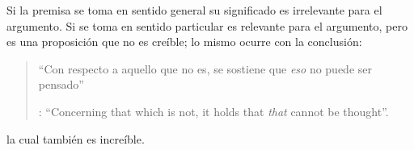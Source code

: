 Si la premisa se toma en sentido general su significado es irrelevante para el argumento. Si se toma en sentido particular es relevante para el argumento, pero es una proposición que no es creíble; lo mismo ocurre con la conclusión: \blockquote[{\Cite[3]{anscombe1981parmenides:pmc}}: \enquote{Concerning that which is not, it holds that \emph{that} cannot be thought}.]{\enquote{Con respecto a aquello que no es, se sostiene que \emph{eso} no puede ser pensado}}. la cual también es increíble.

